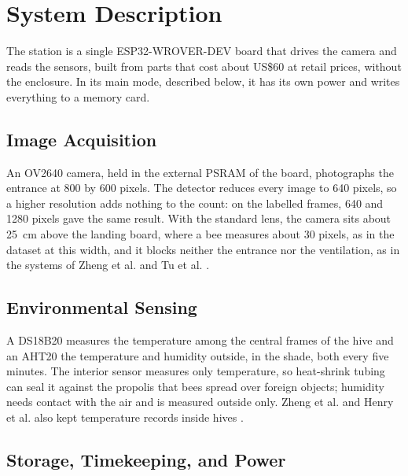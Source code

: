 \documentclass[english,hidelinks]{sbrt}
\begin{document}
\section{System Description}
\label{sec:system-description}

The station is a single ESP32-WROVER-DEV board that drives the camera and reads the sensors, built from parts that cost about US\$60 at retail prices, without the enclosure. In its main mode, described below, it has its own power and writes everything to a memory card.

\subsection{Image Acquisition}

An OV2640 camera, held in the external PSRAM of the board, photographs the entrance at 800 by 600 pixels. The detector reduces every image to 640 pixels, so a higher resolution adds nothing to the count: on the labelled frames, 640 and 1280 pixels gave the same result. With the standard lens, the camera sits about 25~cm above the landing board, where a bee measures about 30 pixels, as in the dataset at this width, and it blocks neither the entrance nor the ventilation, as in the systems of Zheng et al. and Tu et al. \cite{zheng2024intelligent,tu2016automatic}.

\subsection{Environmental Sensing}

A DS18B20 measures the temperature among the central frames of the hive and an AHT20 the temperature and humidity outside, in the shade, both every five minutes. The interior sensor measures only temperature, so heat-shrink tubing can seal it against the propolis that bees spread over foreign objects; humidity needs contact with the air and is measured outside only. Zheng et al. and Henry et al. also kept temperature records inside hives \cite{zheng2024intelligent,henry2019precision}.

\subsection{Storage, Timekeeping, and Power}
\end{document}
